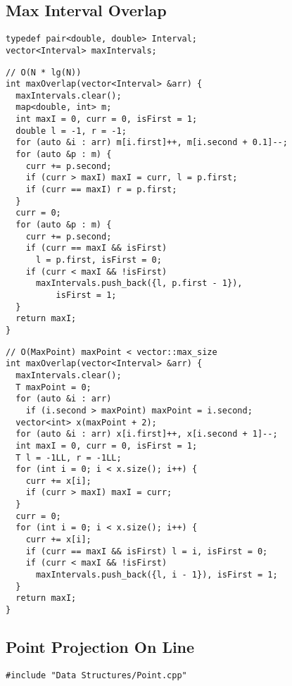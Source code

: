 \documentclass[twoside]{article}
\begin{document}
\begin{multicols*}{2}
\subsection*{Max Interval Overlap}
\begin{verbatim}
typedef pair<double, double> Interval;
vector<Interval> maxIntervals;
\end{verbatim}
\vspace{-12pt}
\begin{verbatim}
// O(N * lg(N))
int maxOverlap(vector<Interval> &arr) {
  maxIntervals.clear();
  map<double, int> m;
  int maxI = 0, curr = 0, isFirst = 1;
  double l = -1, r = -1;
  for (auto &i : arr) m[i.first]++, m[i.second + 0.1]--;
  for (auto &p : m) {
    curr += p.second;
    if (curr > maxI) maxI = curr, l = p.first;
    if (curr == maxI) r = p.first;
  }
  curr = 0;
  for (auto &p : m) {
    curr += p.second;
    if (curr == maxI && isFirst)
      l = p.first, isFirst = 0;
    if (curr < maxI && !isFirst)
      maxIntervals.push_back({l, p.first - 1}),
          isFirst = 1;
  }
  return maxI;
}
\end{verbatim}
\vspace{-12pt}
\begin{verbatim}
// O(MaxPoint) maxPoint < vector::max_size
int maxOverlap(vector<Interval> &arr) {
  maxIntervals.clear();
  T maxPoint = 0;
  for (auto &i : arr)
    if (i.second > maxPoint) maxPoint = i.second;
  vector<int> x(maxPoint + 2);
  for (auto &i : arr) x[i.first]++, x[i.second + 1]--;
  int maxI = 0, curr = 0, isFirst = 1;
  T l = -1LL, r = -1LL;
  for (int i = 0; i < x.size(); i++) {
    curr += x[i];
    if (curr > maxI) maxI = curr;
  }
  curr = 0;
  for (int i = 0; i < x.size(); i++) {
    curr += x[i];
    if (curr == maxI && isFirst) l = i, isFirst = 0;
    if (curr < maxI && !isFirst)
      maxIntervals.push_back({l, i - 1}), isFirst = 1;
  }
  return maxI;
}
\end{verbatim}

\subsectionfont{\large\bfseries\sffamily\underline}
\subsection*{Point Projection On Line}
\begin{verbatim}
#include "Data Structures/Point.cpp"


\end{verbatim}
\end{multicols*}
\end{document}
